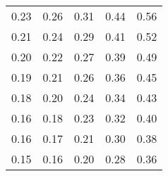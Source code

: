 \begin{tabular}{rrrrr}
  0.23 &   0.26 &   0.31 &   0.44 &     0.56 \\
  0.21 &   0.24 &   0.29 &   0.41 &     0.52 \\
  0.20 &   0.22 &   0.27 &   0.39 &     0.49 \\
  0.19 &   0.21 &   0.26 &   0.36 &     0.45 \\
  0.18 &   0.20 &   0.24 &   0.34 &     0.43 \\
  0.16 &   0.18 &   0.23 &   0.32 &     0.40 \\
  0.16 &   0.17 &   0.21 &   0.30 &     0.38 \\
  0.15 &   0.16 &   0.20 &   0.28 &     0.36 \\
\bottomrule
\end{tabular}
